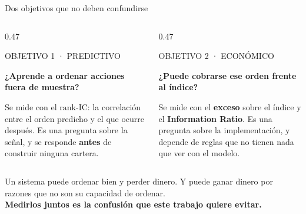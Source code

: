 \documentclass[aspectratio=169,11pt]{beamer}
\newcommand{\rankic}{\text{rank-IC}}
\begin{document}
\begin{frame}{Dos objetivos que no deben confundirse}
  \vspace{0.35cm}
  \begin{columns}[T]
    \begin{column}{0.47\linewidth}
      \colorbox{light}{\parbox{\dimexpr\linewidth-2\fboxsep\relax}{\vspace{0.12cm}
        {\footnotesize\color{slate}\MakeUppercase{Objetivo 1 · predictivo}}\par\medskip
        {\large\color{navy}\textbf{¿Aprende a ordenar acciones fuera de muestra?}}\par\medskip
        {\footnotesize Se mide con el \textbf{$\rankic$}: la correlación entre el orden predicho y
        el que ocurre después. Es una pregunta sobre la señal, y se responde \textbf{antes} de
        construir ninguna cartera.}\vspace{0.12cm}}}
    \end{column}
    \begin{column}{0.47\linewidth}
      \colorbox{light}{\parbox{\dimexpr\linewidth-2\fboxsep\relax}{\vspace{0.12cm}
        {\footnotesize\color{slate}\MakeUppercase{Objetivo 2 · económico}}\par\medskip
        {\large\color{teal}\textbf{¿Puede cobrarse ese orden frente al índice?}}\par\medskip
        {\footnotesize Se mide con el \textbf{exceso} sobre el índice y el \textbf{Information
        Ratio}. Es una pregunta sobre la implementación, y depende de reglas que no tienen nada que
        ver con el modelo.}\vspace{0.12cm}}}
    \end{column}
  \end{columns}
  \vspace{0.40cm}
  \begin{center}
    {\footnotesize Un sistema puede ordenar bien y perder dinero. Y puede ganar dinero por razones
    que no son su capacidad de ordenar.\\[0.15em]
    \textbf{\color{navy}Medirlos juntos es la confusión que este trabajo quiere evitar.}}
  \end{center}
\end{frame}
\end{document}
